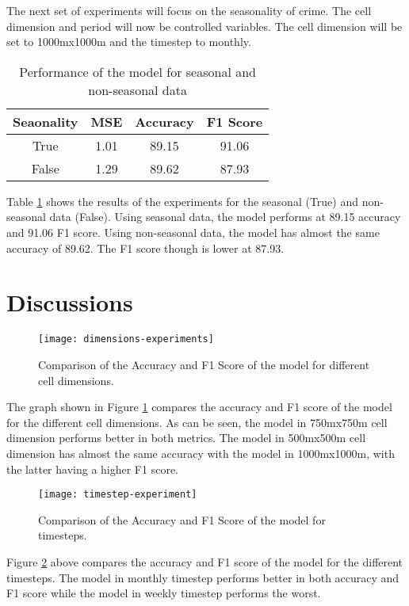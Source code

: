     The next set of experiments will focus on the seasonality of crime. The cell dimension and period will now be controlled variables. The cell dimension will be set to 1000mx1000m and the timestep to monthly.

    \begin{table}[H]
      \centering
      \begin{tabular}{|c|c|c|c|}
            \hline
          \textbf{Seaonality}  &\textbf{MSE}  &\textbf{Accuracy} &\textbf{F1 Score}\\ 
          \hline
          True &1.01 &89.15 &91.06\\
          False  &1.29 &89.62 &87.93 \\
          \hline
        \end{tabular}
      \caption{Performance of the model for seasonal and non-seasonal data}
      \label{table:seasonal-results}
    \end{table}
    Table \ref{table:seasonal-results} shows the results of the experiments for the seasonal (True) and non-seasonal data (False). Using seasonal data, the model performs at 89.15 accuracy and 91.06 F1 score. Using non-seasonal data, the model has almost the same accuracy of 89.62. The F1 score though is lower at 87.93.

\section{Discussions}

    \begin{figure}[H]
    \centering
    \texttt{[image: dimensions-experiments]}
    \caption{Comparison of the Accuracy and F1 Score of the model for different cell dimensions.}
    \label{fig:dimension-experiments}
    \end{figure}
    The graph shown in Figure \ref{fig:dimension-experiments} compares the accuracy and F1 score of the model for the different cell dimensions. As can be seen, the model in 750mx750m cell dimension performs better in both metrics. The model in 500mx500m cell dimension has almost the same accuracy with the model in 1000mx1000m, with the latter having a higher F1 score.

    \begin{figure}[H]
    \centering
    \texttt{[image: timestep-experiment]}
    \caption{Comparison of the Accuracy and F1 Score of the model for timesteps.}
    \label{fig:timestep-experiments}
    \end{figure}
    Figure \ref{fig:timestep-experiments} above compares the accuracy and F1 score of the model for the different timesteps. The model in monthly timestep performs better in both accuracy and F1 score while the model in weekly timestep performs the worst.
    
